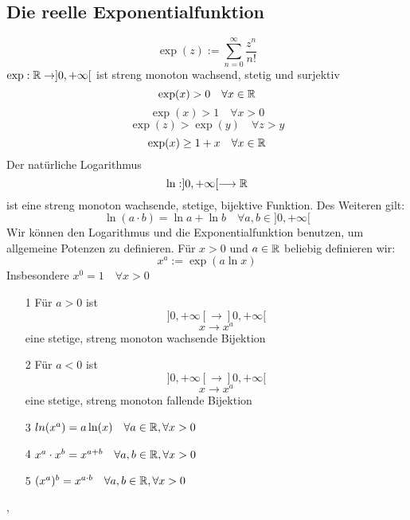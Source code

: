 \subsection{Die reelle Exponentialfunktion}
\Def[Exponentialfunktion] \[ \exp(z) := \sum_{n=0}^{\infty} \frac{z^n}{n!}\]
\Satz[3.24] \(\exp: \mathbb{R} \rightarrow ]0,+\infty[\) ist streng monoton wachsend, stetig und surjektiv \newline
\Korollar[3.25] \[ \exp(x) > 0 \quad \forall x \in \mathbb{R} \]
\[\exp(x) > 1 \quad \forall x > 0\] \newline
\Korollar[3.26] \[\exp(z) > \exp(y) \quad \forall z > y\]
\Korollar[3.27] \[\exp(x) \geq 1 + x \quad \forall x \in \mathbb{R}\]
\Korollar[3.28] Der natürliche Logarithmus
\[\ln : ]0,+\infty[ \longrightarrow \mathbb{R} \] ist eine streng monoton wachsende, stetige, bijektive Funktion. Des Weiteren gilt:
\[\ln(a \cdot b) = \ln a + \ln b \quad \forall a,b \in ]0,+\infty[\]
Wir können den Logarithmus und die Exponentialfunktion benutzen, um allgemeine Potenzen zu definieren. Für \(x > 0\) und \( a \in \mathbb{R} \) beliebig definieren wir:
\[ x^a := \exp( a \ln x)\]
Insbesondere \( x^0 = 1 \quad \forall x > 0\) \newline
\Korollar[3.29]
\begin{enumerate}
    \item [1] Für \(a > 0\) ist \[]0,+\infty[ \longrightarrow ]0,+\infty[\]
    \[x \longrightarrow x^a\] eine stetige, streng monoton wachsende Bijektion \newline
    \item [2] Für \(a < 0\) ist \[]0,+\infty[ \longrightarrow ]0,+\infty[\]
    \[x \longrightarrow x^a\] eine stetige, streng monoton fallende Bijektion
    \item [3] \(ln(x^a) = a \ln(x) \quad \forall a \in \mathbb{R}, \forall x > 0\)
    \item [4] \(x^a \cdot x^b = x^{a+b} \quad \forall a,b \in \mathbb{R}, \forall x > 0\)
    \item [5] \((x^a)^b = x^{a \cdot b} \quad \forall a,b \in \mathbb{R}, \forall x > 0\)
\end{enumerate}
\sep
